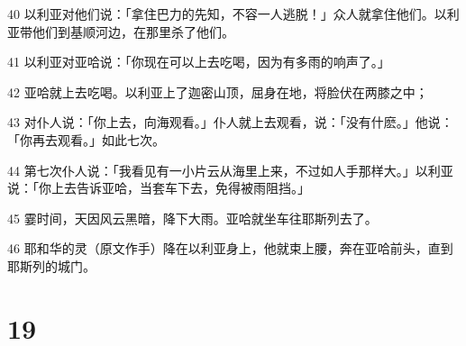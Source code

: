 \par 40 以利亚对他们说：「拿住巴力的先知，不容一人逃脱！」众人就拿住他们。以利亚带他们到基顺河边，在那里杀了他们。
\par 41 以利亚对亚哈说：「你现在可以上去吃喝，因为有多雨的响声了。」
\par 42 亚哈就上去吃喝。以利亚上了迦密山顶，屈身在地，将脸伏在两膝之中；
\par 43 对仆人说：「你上去，向海观看。」仆人就上去观看，说：「没有什麽。」他说：「你再去观看。」如此七次。
\par 44 第七次仆人说：「我看见有一小片云从海里上来，不过如人手那样大。」以利亚说：「你上去告诉亚哈，当套车下去，免得被雨阻挡。」
\par 45 霎时间，天因风云黑暗，降下大雨。亚哈就坐车往耶斯列去了。
\par 46 耶和华的灵（原文作手）降在以利亚身上，他就束上腰，奔在亚哈前头，直到耶斯列的城门。

\chapter{19}

